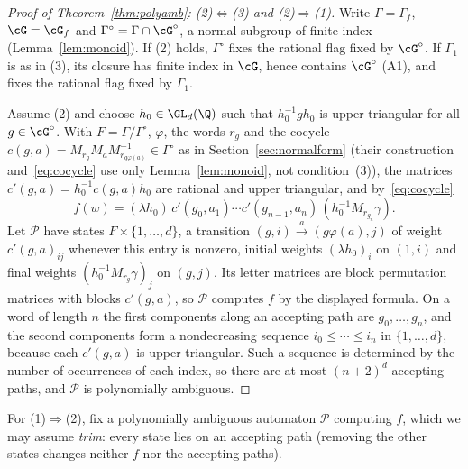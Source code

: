 \begin{proof}[Proof of Theorem~\ref{thm:polyamb}: (2)$\Leftrightarrow$(3) and (2)$\Rightarrow$(1)]
Write $\Gamma=\Gamma_f$, $\cG=\cG_f$ and $\Gamma^\circ=\Gamma\cap\cG^\circ$, a normal subgroup of
finite index (Lemma~\ref{lem:monoid}). If (2) holds, $\Gamma^\circ$ fixes the rational flag fixed by
$\cG^\circ$. If $\Gamma_1$ is as in (3), its closure has finite index in $\cG$, hence contains
$\cG^\circ$ (A1), and fixes the rational flag fixed by $\Gamma_1$.

Assume (2) and choose $h_0\in\GL_d(\Q)$ such that $h_0^{-1}gh_0$ is upper triangular for all
$g\in\cG^\circ$. With $F=\Gamma/\Gamma^\circ$, $\varphi$, the words $r_g$ and the cocycle
$c(g,a)=M_{r_g}M_aM_{r_{g\varphi(a)}}^{-1}\in\Gamma^\circ$ as in Section~\ref{sec:normalform} (their
construction and~\eqref{eq:cocycle} use only Lemma~\ref{lem:monoid}, not condition~(3)), the
matrices $c'(g,a)=h_0^{-1}c(g,a)h_0$ are rational and upper triangular, and by~\eqref{eq:cocycle}
\[
f(w)=(\lambda h_0)\,c'(g_0,a_1)\cdots c'(g_{n-1},a_n)\,(h_0^{-1}M_{r_{g_n}}\gamma).
\]
Let $\mathcal P$ have states $F\times\{1,\ldots,d\}$, a transition $(g,i)\xrightarrow{a}(g\varphi(a),j)$
of weight $c'(g,a)_{ij}$ whenever this entry is nonzero, initial weights $(\lambda h_0)_i$ on $(1,i)$ and
final weights $(h_0^{-1}M_{r_g}\gamma)_j$ on $(g,j)$. Its letter matrices are block permutation matrices
with blocks $c'(g,a)$, so $\mathcal P$ computes $f$ by the displayed formula. On a word of length $n$
the first components along an accepting path are $g_0,\ldots,g_n$, and the second components form a
nondecreasing sequence $i_0\le\cdots\le i_n$ in $\{1,\ldots,d\}$, because each $c'(g,a)$ is upper
triangular. Such a sequence is determined by the number of occurrences of each index, so there are at most $(n+2)^d$ accepting paths, and $\mathcal P$ is
polynomially ambiguous.
\end{proof}

For (1)$\Rightarrow$(2), fix a polynomially ambiguous automaton $\mathcal P$ computing $f$, which we may
assume \emph{trim}: every state lies on an accepting path (removing the other states changes neither
$f$ nor the accepting paths).

